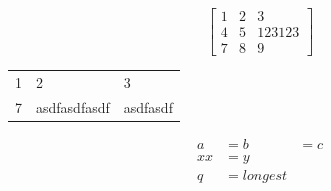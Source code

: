 \[
  \begin{bmatrix}
    1 & 2 & 3      \\
    4 & 5 & 123123 \\
    7 & 8 & 9
  \end{bmatrix}
\]

\begin{tabular}{lll}
  1 & 2            & 3        \\
  7 & asdfasdfasdf & asdfasdf
\end{tabular}

\begin{align}
  a  & = b       & = c \\
  xx & = y             \\[2ex] %
  q  & = longest
\end{align}
